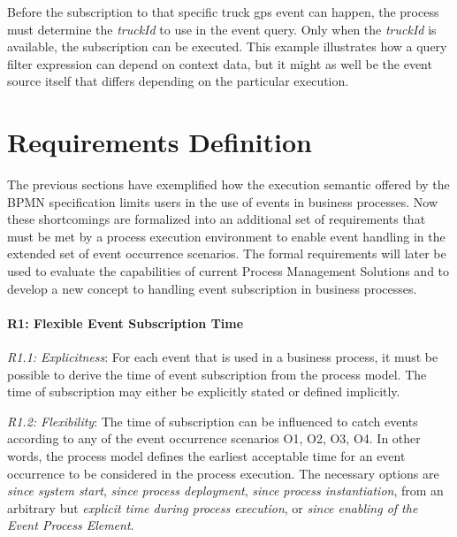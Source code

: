 
Before the subscription to that specific truck gps event can happen, the process must determine the \textit{truckId} to use in the event query. Only when the \textit{truckId} is available, the subscription can be executed. This example illustrates how a query filter expression can depend on context data, but it might as well be the event source itself that differs depending on the particular execution.




\section{Requirements Definition}
The previous sections have exemplified how the execution semantic offered by the BPMN specification limits users in the use of events in business processes. Now these shortcomings are formalized into an additional set of requirements that must be met by a process execution environment to enable event handling in the extended set of event occurrence scenarios.
The formal requirements will later be used to evaluate the capabilities of current Process Management Solutions and to develop a new concept to handling event subscription in business processes. 

\paragraph{R1: Flexible Event Subscription Time\newline}

\textit{R1.1: Explicitness}: 
For each event that is used in a business process, it must be possible to derive the time of event subscription from the process model. The time of subscription may either be explicitly stated or defined implicitly.

\textit{R1.2: Flexibility}: 
The time of subscription can be influenced to catch events according to any of the event occurrence scenarios O1, O2, O3, O4. In other words, the process model defines the earliest acceptable time for an event occurrence to be considered in the process execution. The necessary options are \textit{since system start}, \textit{since process deployment}, \textit{since process instantiation}, from an arbitrary but \textit{explicit time during process execution}, or \textit{since enabling of the Event Process Element}.

